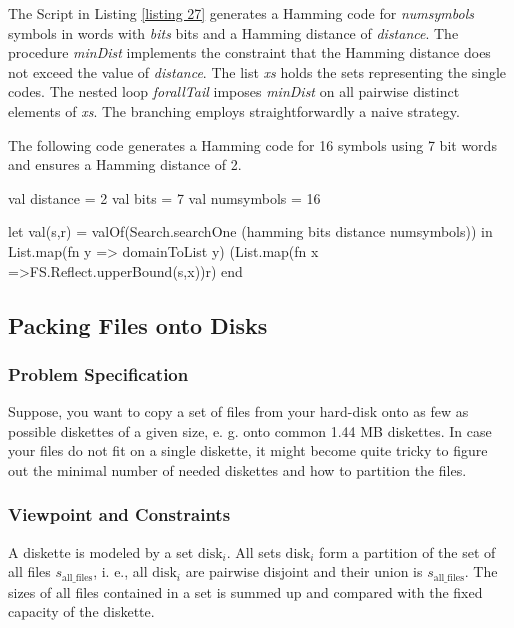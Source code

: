 \documentclass[a4paper,halfparskip]{scrartcl}
\begin{document}
The Script in Listing \ref{listing 27} generates a Hamming 
code for \emph{numsymbols} symbols in words with \emph{bits} bits 
and a Hamming distance of \emph{distance}. The procedure \emph{minDist} 
implements the constraint that the Hamming distance does not 
exceed the value of \emph{distance}. The list \emph{xs} holds the sets 
representing the single codes.
The nested loop \emph{forallTail} 
imposes \emph{minDist} on all pairwise distinct elements of \emph{xs}. 
The branching employs straightforwardly a naive strategy.

The following code generates a Hamming code for 16 symbols 
using 7 bit words and ensures a Hamming distance of 2. 
\lstset{label=listing 28,frame=trbl}
\begin{myverbatim}
val distance = 2
val bits = 7
val numsymbols = 16 

let 
    val(s,r) = valOf(Search.searchOne
                (hamming bits distance numsymbols))
in
    List.map(fn y => domainToList y)
     (List.map(fn x =>FS.Reflect.upperBound(s,x))r)
end 

\end{myverbatim}






\newpage
\subsection{Packing Files onto Disks}

\subsubsection{Problem Specification}
Suppose, you want to copy a set of files from your hard-disk 
onto as few as possible diskettes of a given size, e. g. onto 
common 1.44 MB diskettes. In case your files do not fit on a 
single diskette, it might become quite tricky to figure out 
the minimal number of needed diskettes and how to partition the files. 

\subsubsection{Viewpoint and Constraints}
A diskette is modeled by a set $\text{disk}_i$. All sets $\text{disk}_i$  
form a partition of the set of all files $s_\text{all\_files}$, 
i. e., all $\text{disk}_i$ are pairwise disjoint and their union is 
$s_\text{all\_files}$. The sizes of all files contained in a set is 
summed up and compared with the fixed capacity of the diskette. 
\end{document}
